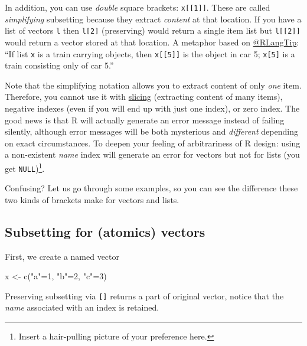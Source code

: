 \documentclass[
]{book}
\newenvironment{Shaded}{\begin{snugshade}}{\end{snugshade}}
\newcommand{\DecValTok}[1]{\textcolor[rgb]{0.00,0.00,0.81}{#1}}
\newcommand{\FunctionTok}[1]{\textcolor[rgb]{0.00,0.00,0.00}{#1}}
\newcommand{\NormalTok}[1]{#1}
\newcommand{\OtherTok}[1]{\textcolor[rgb]{0.56,0.35,0.01}{#1}}
\newcommand{\StringTok}[1]{\textcolor[rgb]{0.31,0.60,0.02}{#1}}
\begin{document}
In addition, you can use \emph{double} square brackets: \texttt{x{[}{[}1{]}{]}}. These are called \emph{simplifying} subsetting because they extract \emph{content} at that location. If you have a list of vectors \texttt{l} then \texttt{l{[}2{]}} (preserving) would return a single item list but \texttt{l{[}{[}2{]}{]}} would return a vector stored at that location. A metaphor based on \href{https://twitter.com/rlangtip}{@RLangTip}: ``If list \texttt{x} is a train carrying objects, then \texttt{x{[}{[}5{]}{]}} is the object in car 5; \texttt{x{[}5{]}} is a train consisting only of car 5.''

Note that the simplifying notation allows you to extract content of only \emph{one} item. Therefore, you cannot use it with \protect\hyperlink{vector-index-slicing}{slicing} (extracting content of many items), negative indexes (even if you will end up with just one index), or zero index. The good news is that R will actually generate an error message instead of failing silently, although error messages will be both mysterious and \emph{different} depending on exact circumstances. To deepen your feeling of arbitrariness of R design: using a non-existent \emph{name} index will generate an error for vectors but not for lists (you get \texttt{NULL})\footnote{Insert a hair-pulling picture of your preference here.}.

Confusing? Let us go through some examples, so you can see the difference these two kinds of brackets make for vectors and lists.

\hypertarget{subsetting-for-atomics-vectors}{%
\subsection{Subsetting for (atomics) vectors}\label{subsetting-for-atomics-vectors}}

First, we create a named vector

\begin{Shaded}
\begin{Highlighting}[]
\NormalTok{x }\OtherTok{\textless{}{-}} \FunctionTok{c}\NormalTok{(}\StringTok{"a"}\OtherTok{=}\DecValTok{1}\NormalTok{, }\StringTok{"b"}\OtherTok{=}\DecValTok{2}\NormalTok{, }\StringTok{"c"}\OtherTok{=}\DecValTok{3}\NormalTok{)}
\end{Highlighting}
\end{Shaded}

Preserving subsetting via \texttt{{[}{]}} returns a part of original vector, notice that the \emph{name} associated with an index is retained.
\end{document}
